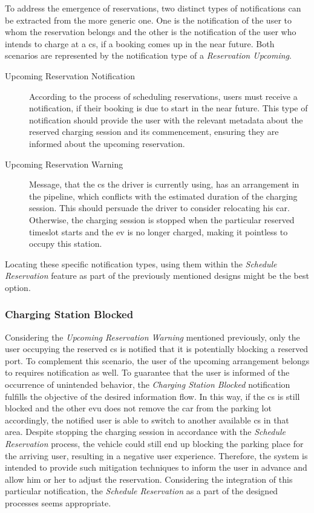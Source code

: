 To address the emergence of reservations, two distinct types of notifications can be extracted from the more generic one. One is the notification of the user to whom the reservation belongs and the other is the notification of the user who intends to charge at a \acrshort{cs}, if a booking comes up in the near future.
Both scenarios are represented by the notification type of a \textit{Reservation Upcoming}.

\begin{description}
    \item[Upcoming Reservation Notification] According to the process of scheduling reservations, users must receive a notification, if their booking is due to start in the near future.
    This type of notification should provide the user with the relevant metadata about the reserved charging session and its commencement, ensuring they are informed about the upcoming reservation.
    \item[Upcoming Reservation Warning] Message, that the \acrshort{cs} the driver is currently using, has an arrangement in the pipeline, which conflicts with the estimated duration of the charging session. This should persuade the driver to consider relocating his car.
    Otherwise, the charging session is stopped when the particular reserved timeslot starts and the \acrshort{ev} is no longer charged, making it pointless to occupy this station.
\end{description}

\noindent Locating these specific notification types, using them within the \textit{Schedule Reservation} feature as part of the previously mentioned designs might be the best option.

\subsubsection{Charging Station Blocked}
\label{ch:Design:sec:Reservation System:ssec:Notification Capabilities:sssec:Charging Station Blocked}

Considering the \textit{Upcoming Reservation Warning} mentioned previously, only the user occupying the reserved \acrshort{cs} is notified that it is potentially blocking a reserved port. To complement this scenario, the user of the upcoming arrangement belongs to requires notification as well.
To guarantee that the user is informed of the occurrence of unintended behavior, the \textit{Charging Station Blocked} notification fulfills the objective of the desired information flow. In this way, if the \acrshort{cs} is still blocked and the other \acrshort{evu} does not remove the car from the parking lot accordingly, the notified user is able to switch to another available \acrshort{cs} in that area.
Despite stopping the charging session in accordance with the \textit{Schedule Reservation} process, the vehicle could still end up blocking the parking place for the arriving user, resulting in a negative user experience. Therefore, the system is intended to provide such mitigation techniques to inform the user in advance and allow him or her to adjust the reservation.
Considering the integration of this particular notification, the \textit{Schedule Reservation} as a part of the designed processes seems appropriate.


